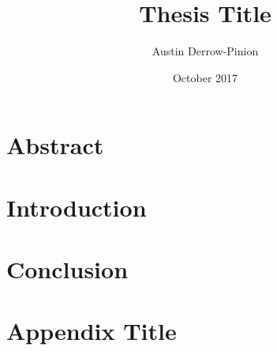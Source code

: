 \documentclass[12pt]{report}
\title{Thesis Title}
\author{Austin Derrow-Pinion}
\date{October 2017}
\begin{document}


\chapter*{Abstract}


\tableofcontents

\chapter{Introduction}


\chapter{Conclusion}


\appendix
\chapter{Appendix Title}


\printbibliography
\end{document}
